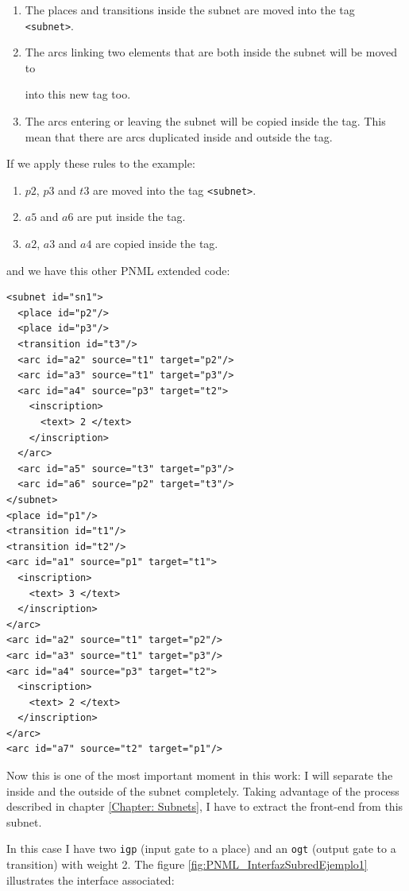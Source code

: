 \begin{enumerate}
\item The places and transitions inside the subnet are moved into the tag
\texttt{<subnet>}.
\item The arcs linking two elements that are both inside the subnet will be moved to

 into this new tag too.
\item The arcs entering or leaving the subnet will be copied inside the tag.
This mean that there are arcs duplicated inside and outside the tag.
\end{enumerate}


If we apply these rules to the example:

\begin{enumerate}
\item $p2$, $p3$ and $t3$ are moved into the tag \texttt{<subnet>}.
\item $a5$ and $a6$ are put inside the tag.
\item $a2$, $a3$ and $a4$ are copied inside the tag.
\end{enumerate}

and we have this other PNML extended code: 

\begin{lstlisting}
<subnet id="sn1">
  <place id="p2"/>
  <place id="p3"/>
  <transition id="t3"/>
  <arc id="a2" source="t1" target="p2"/>
  <arc id="a3" source="t1" target="p3"/>
  <arc id="a4" source="p3" target="t2">
    <inscription>
      <text> 2 </text>
    </inscription>
  </arc>
  <arc id="a5" source="t3" target="p3"/>
  <arc id="a6" source="p2" target="t3"/>
</subnet>
<place id="p1"/>
<transition id="t1"/>
<transition id="t2"/>
<arc id="a1" source="p1" target="t1">
  <inscription>
    <text> 3 </text>
  </inscription>
</arc>
<arc id="a2" source="t1" target="p2"/>
<arc id="a3" source="t1" target="p3"/>
<arc id="a4" source="p3" target="t2">
  <inscription>
    <text> 2 </text>
  </inscription>
</arc>
<arc id="a7" source="t2" target="p1"/>
\end{lstlisting}

Now this is one of the most important moment in this work: I will separate the inside
and the outside of the subnet completely. Taking advantage of the process described in chapter \ref{Chapter: Subnets}, I have to extract the front-end from this subnet.

In this case I have two \texttt{igp} (input gate to a place) and an \texttt{ogt} (output gate to a transition) with weight 2. The figure \ref{fig:PNML_InterfazSubredEjemplo1} illustrates the interface associated:


